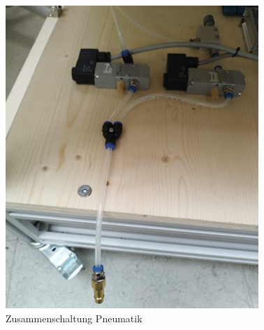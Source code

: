 \begin{figure}[H]
    \centering
    \includegraphics[scale=0.6]{image/zusammenpneumatik.jpg}
    \caption{Zusammenschaltung Pneumatik}
    \label{fig:enter-label}
\end{figure}


